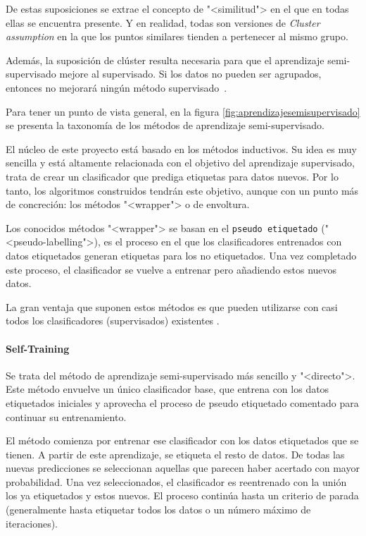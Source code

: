 De estas suposiciones se extrae el concepto de "<similitud"> en el que en todas
ellas se encuentra presente. Y en realidad, todas son versiones de
\textit{Cluster assumption} en la que los puntos similares tienden a pertenecer
al mismo grupo. 

Además, la suposición de clúster resulta necesaria para que el aprendizaje
semi-supervisado mejore al supervisado. Si los datos no pueden ser agrupados,
entonces no mejorará ningún método supervisado~\cite{vanEngelen2020}.


Para tener un punto de vista general, en la figura \ref{fig:aprendizajesemisupervisado} se presenta la
taxonomía de los métodos de aprendizaje semi-supervisado.


El núcleo de este proyecto está basado en los métodos inductivos. Su idea es muy
sencilla y está altamente relacionada con el objetivo del aprendizaje
supervisado, trata de crear un clasificador que prediga etiquetas para datos
nuevos. Por lo tanto, los algoritmos construidos tendrán este objetivo, aunque
con un punto más de concreción: los métodos "<wrapper"> o de envoltura.

Los conocidos métodos "<wrapper"> se basan en el \texttt{pseudo etiquetado}
("<pseudo-labelling">), es el proceso en el que los clasificadores entrenados
con datos etiquetados generan etiquetas para los no etiquetados. Una vez
completado este proceso, el clasificador se vuelve a entrenar pero añadiendo
estos nuevos datos.

La gran ventaja que suponen estos métodos es que pueden utilizarse con casi
todos los clasificadores (supervisados) existentes \cite{vanEngelen2020}.

\paragraph{Self-Training}
Se trata del método de aprendizaje semi-supervisado más sencillo y "<directo">.
Este método envuelve un único clasificador base, que entrena con los datos
etiquetados iniciales y aprovecha el proceso de pseudo etiquetado comentado para
continuar su entrenamiento.

El método comienza por entrenar ese clasificador con los datos etiquetados que
se tienen. A partir de este aprendizaje, se etiqueta el resto de datos. De todas
las nuevas predicciones se seleccionan aquellas que parecen haber acertado con
mayor probabilidad. Una vez seleccionados, el clasificador es reentrenado con la
unión los ya etiquetados y estos nuevos. El proceso continúa hasta un criterio
de parada (generalmente hasta etiquetar todos los datos o un número máximo de
iteraciones).

